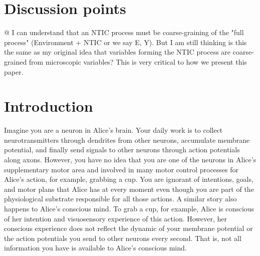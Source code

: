 \documentclass[utf8]{article}
\begin{document}
    \newpage
    \section*{Discussion points}
        \begin{ants}
            @ I can understand that an NTIC process must be coarse-graining of the "full process" (Environment + NTIC or we say {E, Y}). But I am still thinking is this the same as my original idea that variables forming the NTIC process are coarse-grained from microscopic variables? This is very critical to how we present this paper. 
            
        \end{ants}    
    

    \newpage
	\section{Introduction}

		Imagine you are a neuron in Alice's brain. Your daily work is to collect neurotransmitters through dendrites from other neurons, accumulate membrane potential, and finally send signals to other neurons through action potentials along axons. However, you have no idea that you are one of the neurons in Alice's supplementary motor area and involved in many motor control processes for Alice's action, for example, grabbing a cup. You are ignorant of intentions, goals, and motor plans that Alice has at every moment even though you are part of the physiological substrate responsible for all those actions.
		A similar story also happens to Alice's conscious mind. To grab a cup, for example, Alice is conscious of her intention and visuosensory experience of this action. However, her conscious experience does not reflect the dynamic of your membrane potential or the action potentials you send to other neurons every second. That is, not all information you have is available to Alice's conscious mind.

		
\end{document}
